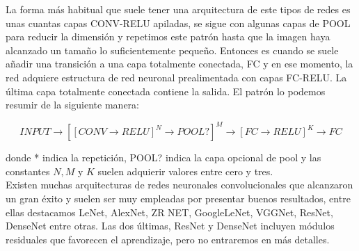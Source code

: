    La forma más habitual que suele tener una arquitectura de este tipos de redes es unas cuantas capas CONV-RELU apiladas, se sigue con algunas capas de POOL para reducir la dimensión y repetimos este patrón hasta que la imagen haya alcanzado un tamaño lo suficientemente pequeño. Entonces es cuando se suele añadir una transición a una capa totalmente conectada, FC y en ese momento, la red adquiere estructura de red neuronal prealimentada con capas FC-RELU. La última capa totalmente conectada contiene la salida. El patrón lo podemos resumir de la siguiente manera:
    
    \begin{equation}
        INPUT \to [[CONV \to RELU]^N \to POOL?]^M \to [FC \to RELU]^K \to FC 
    \end{equation}
    
    \noindent donde * indica la repetición, POOL? indica la capa opcional de pool y las constantes $N,M$ y $K$ suelen adquierir valores entre cero y tres.\\
    
    Existen muchas arquitecturas de redes neuronales convolucionales que alcanzaron un gran éxito y suelen ser muy empleadas por presentar buenos resultados, entre ellas destacamos LeNet, AlexNet, ZR NET, GoogleLeNet, VGGNet, ResNet, DenseNet entre otras. Las dos últimas, ResNet y DenseNet incluyen módulos residuales que favorecen el aprendizaje, pero no entraremos en más detalles. \\ 
        
        
    
\endinput






Patrones de capas
La forma más común de una arquitectura ConvNet apila unas cuantas capas CONV-RELU, las sigue con capas POOL, y repite este patrón hasta que la imagen se ha fusionado espacialmente a un tamaño pequeño. En algún momento, es común la transición a capas totalmente conectadas. La última capa totalmente conectada contiene la salida, como las puntuaciones de las clases. En otras palabras, la arquitectura ConvNet más común sigue el patrón: